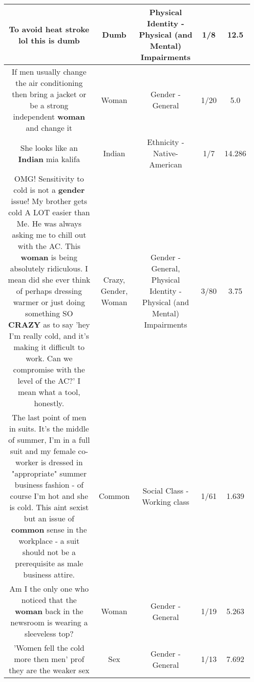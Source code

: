 \documentclass[11pt]{article}
\newlength\mylength
\begin{document}
\begin{center}
\begin{longtable}{|C{.65\mylength}|C{.30\mylength}|C{.12\mylength}|C{.12\mylength}|C{.12\mylength}|}
  \small To avoid heat stroke lol this is dumb\normalsize   & Dumb & Physical Identity - Physical (and Mental) Impairments & 1/8 & 12.5 \\  \hline
  \small If men usually change the air conditioning then bring a jacket or be a strong independent \textbf{woman} and change it\normalsize   & Woman & Gender - General & 1/20 & 5.0 \\  \hline
  \small She looks like an \textbf{Indian} mia kalifa\normalsize   & Indian & Ethnicity - Native-American & 1/7 & 14.286 \\  \hline
  \small OMG! Sensitivity to cold is not a \textbf{gender} issue! My brother gets cold A LOT easier than Me. He was always asking me to chill out with the AC. This \textbf{woman} is being absolutely ridiculous. I mean did she ever think of perhaps dressing warmer or just doing something SO \textbf{CRAZY} as to say 'hey I'm really cold, and it's making it difficult to work. Can we compromise with the level of the AC?' I mean what a tool, honestly.\normalsize   & Crazy, Gender, Woman & Gender - General, Physical Identity - Physical (and Mental) Impairments & 3/80 & 3.75 \\  \hline
  \small The last point of men in suits.  It's the middle of summer, I'm in a full suit and my female co-worker is dressed in "appropriate" summer business fashion - of course I'm hot and she is cold.  This aint sexist but an issue of \textbf{common} sense in the workplace - a suit should not be a prerequisite as male business attire.\normalsize   & Common & Social Class - Working class & 1/61 & 1.639 \\  \hline
  \small Am I the only one who noticed that the \textbf{woman} back in the newsroom is wearing a sleeveless top?\normalsize   & Woman & Gender - General & 1/19 & 5.263 \\  \hline
  \small 'Women fell the cold more then men' prof they are the weaker sex\normalsize   & Sex & Gender - General & 1/13 & 7.692 \\  \hline

\end{longtable}
\end{center}
\end{document}

